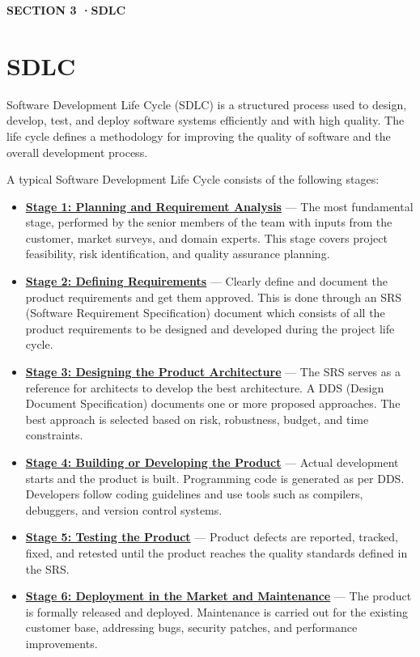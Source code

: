 \documentclass[12pt, a4paper]{article}
\newcommand{\sectionbadge}[2]{%
  \vspace{12pt}\noindent
  \colorbox{pharmagreen}{%
    \parbox{\dimexpr\textwidth-2\fboxsep\relax}{%
      \vspace{4pt}
      \color{white}\small\bfseries\MakeUppercase{Section #1 \quad·\quad #2}
      \vspace{4pt}
    }%
  }\vspace{6pt}
}
\begin{document}
\tableofcontents
\newpage
{}

\sectionbadge{3}{SDLC}
\section{SDLC}

Software Development Life Cycle (SDLC) is a structured process used to design, develop, test, and deploy software systems efficiently and with high quality. The life cycle defines a methodology for improving the quality of software and the overall development process.

A typical Software Development Life Cycle consists of the following stages:

\begin{itemize}[leftmargin=1.5em, itemsep=5pt]
  \item \textbf{\underline{Stage 1: Planning and Requirement Analysis}} ---
        The most fundamental stage, performed by the senior members of the team with inputs from the customer, market surveys, and domain experts. This stage covers project feasibility, risk identification, and quality assurance planning.

  \item \textbf{\underline{Stage 2: Defining Requirements}} ---
        Clearly define and document the product requirements and get them approved. This is done through an SRS (Software Requirement Specification) document which consists of all the product requirements to be designed and developed during the project life cycle.

  \item \textbf{\underline{Stage 3: Designing the Product Architecture}} ---
        The SRS serves as a reference for architects to develop the best architecture. A DDS (Design Document Specification) documents one or more proposed approaches. The best approach is selected based on risk, robustness, budget, and time constraints.

  \item \textbf{\underline{Stage 4: Building or Developing the Product}} ---
        Actual development starts and the product is built. Programming code is generated as per DDS. Developers follow coding guidelines and use tools such as compilers, debuggers, and version control systems.

  \item \textbf{\underline{Stage 5: Testing the Product}} ---
        Product defects are reported, tracked, fixed, and retested until the product reaches the quality standards defined in the SRS.

  \item \textbf{\underline{Stage 6: Deployment in the Market and Maintenance}} ---
        The product is formally released and deployed. Maintenance is carried out for the existing customer base, addressing bugs, security patches, and performance improvements.
\end{itemize}
\end{document}
